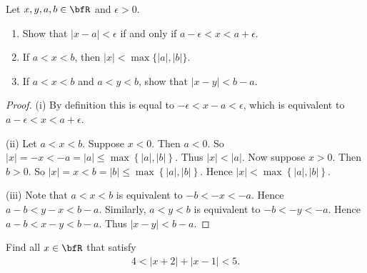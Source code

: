 \documentclass[10pt,twoside,openany]{memoir}
\begin{document}
    \begin{exercise}
          Let $x,y,a,b \in \bfR$ and $\epsilon > 0$.  
    \end{exercise}
        \begin{enumerate}[label = (\roman*)]
            \item Show that $|x-a| < \epsilon$ if and only if $a - \epsilon < x < a + \epsilon$.
            \item If $a < x < b$, then $|x| < \max{\{|a|,|b|\}}$.
            \item If $a<x<b$ and $a < y < b$, show that $|x - y| < b- a$.
        \end{enumerate}
            \begin{proof}
                (i) By definition this is equal to $ - \epsilon < x - a < \epsilon$, which is equivalent to $a -\epsilon < x < a + \epsilon$.

                (ii) Let $a < x < b$. Suppose $x < 0$. Then $a < 0$. So $|x| = -x < -a = |a| \leq \max{\left\{ |a|,|b| \right\}}$. Thus $|x| < |a|$. Now suppose $x > 0$. Then $b > 0$. So $|x| = x < b = |b| \leq \max{\left\{ |a|,|b| \right\}}$. Hence $|x| < \max{\left\{ |a|,|b| \right\}}$.

                (iii) Note that $a < x < b$ is equivalent to $-b < -x < -a$. Hence $a-b < y-x < b-a$. Similarly, $a < y < b$ is equivalent to $-b < -y < -a$. Hence $a-b < x -y < b-a$. Thus $|x-y| < b-a$.
            \end{proof}
    \begin{exercise}
        Find all $x \in \bfR$ that satisfy
            \begin{equation*}
            \begin{split}
                4 < \left| x+2 \right| + \left| x-1 \right| < 5.
            \end{split}
            \end{equation*}
    \end{exercise}
\end{document}
